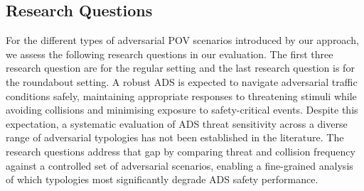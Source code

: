 \documentclass[sigconf,review,anonymous]{acmart}
\begin{document}
\subsection{Research Questions}
For the different types of adversarial POV scenarios introduced by our approach, we assess the following research questions in our evaluation. The first three research question are for the regular setting and the last research question is for the roundabout setting. A robust ADS is expected to navigate adversarial traffic conditions safely, maintaining appropriate responses to threatening stimuli while avoiding collisions and minimising exposure to safety-critical events. Despite this expectation, a systematic evaluation of ADS threat sensitivity across a diverse range of adversarial typologies has not been established in the literature. The research questions address that gap by comparing threat and collision frequency against a controlled set of adversarial scenarios, enabling a fine-grained analysis of which typologies most significantly degrade ADS safety performance.
\end{document}
